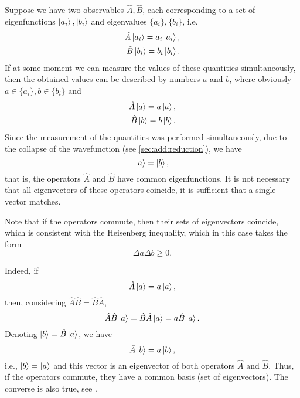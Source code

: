 Suppose we have two observables $\hat{A}, \hat{B}$, each corresponding to a set of eigenfunctions $\ket{a_i},
\ket{b_i}$ and eigenvalues $\{a_i\}, \{b_i\}$, i.e.
\begin{eqnarray}
  \hat{A}\ket{a_i} = a_i \ket{a_i},
  \nonumber \\
  \hat{B}\ket{b_i} = b_i \ket{b_i}.
  \nonumber
\end{eqnarray}
If at some moment we can measure the values of these quantities simultaneously, then the obtained values can be described by numbers $a$ and $b$, where obviously $a \in \{a_i\}, b \in \{b_i\}$ and
\begin{eqnarray}
  \hat{A}\ket{a} = a \ket{a},
  \nonumber \\
  \hat{B}\ket{b} = b \ket{b}.
  \nonumber
\end{eqnarray}
Since the measurement of the quantities was performed simultaneously, due to the collapse of the wavefunction (see \autoref{sec:add:reduction}), we have
\[
\ket{a} = \ket{b},
\]
that is, the operators $\hat{A}$ and $\hat{B}$ have common eigenfunctions. It is not necessary that all eigenvectors of these operators coincide, it is sufficient that a single vector matches.

Note that if the operators commute, then their sets of eigenvectors coincide, which is consistent with the Heisenberg inequality, which in this case takes the form
\[
\Delta a \Delta b \ge 0.
\]

Indeed, if
\[
\hat{A} \ket{a} = a \ket{a}, 
\]
then, considering $\hat{A}\hat{B} = \hat{B}\hat{A}$,
\[
\hat{A}\hat{B}\ket{a} = 
\hat{B}\hat{A}\ket{a} =
a \hat{B}\ket{a}.
\]
Denoting $\ket{b} = \hat{B}\ket{a}$, we have
\[
\hat{A}\ket{b} = 
a \ket{b},
\]
i.e.,
$\ket{b} = \ket{a}$ and this vector is an eigenvector 
of both operators $\hat{A}$ and  $\hat{B}$. Thus, if the operators
commute, they have a common basis (set of eigenvectors). The converse is also true, see \cite{bHolevo2016}.